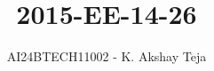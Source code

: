 \documentclass[journal,9pt,onecolumn]{IEEEtran}
\begin{document}

\vspace{3cm}
\title{2015-EE-14-26}
\author{AI24BTECH11002 - K. Akshay Teja}
\maketitle
 \bigskip
{\let\newpage\relax\maketitle}

\renewcommand{\thefigure}{\theenumi}
\renewcommand{\thetable}{\theenumi}
\setlength{\intextsep}{10pt} %

\renewcommand{\thetable}{\theenumi}
\end{document}
